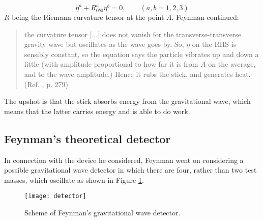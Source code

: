 \documentclass{ws-procs961x669}            %
\begin{document}
%
\begin{equation}\label{PiraniEq}
\ddot{\eta}^a+R^{a}_{0b0}\eta^b=0, \qquad (a,b=1,2,3)
\end{equation}
%
$R$ being the Riemann curvature tensor at the point $A$. Feynman
continued:
%
\begin{quote}
the curvature tensor [...] does not vanish for the
transverse-transverse gravity wave but oscillates as the wave goes
by. So, $\eta$ on the RHS is sensibly constant, so the equation
says the particle vibrates up and down a little (with amplitude
proportional to how far it is from $A$ on the average, and to the
wave amplitude.) Hence it rubs the stick, and generates heat.
(Ref. , p. 279)
\end{quote}
%
The upshot is that the stick absorbs energy from the gravitational
wave, which means that the latter carries energy and is able to do
work.

\subsection{Feynman's theoretical detector}

In connection with the device he considered, Feynman went on
considering a possible gravitational wave detector in which there
are four, rather than two test masses, which oscillate as shown in
Figure \ref{aba:fig1}.

\begin{figure}
\centering
\texttt{[image: detector]}
\caption{Scheme of Feynman's gravitational wave detector.}
\label{aba:fig1}
\end{figure}
\end{document}
